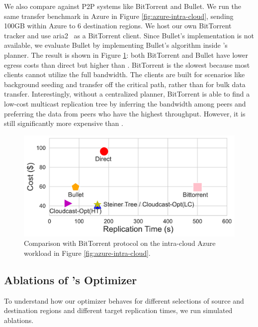We also compare \sys{} against P2P systems like BitTorrent and Bullet. 
We run the same transfer benchmark in Azure in Figure \ref{fig:azure-intra-cloud}, sending 100GB within Azure to 6 destination regions. We host our own BitTorrent tracker and use aria2~\cite{aria2} as a BitTorrent client. Since Bullet's implementation is not available, we evaluate Bullet by implementing Bullet's algorithm inside \sys{}'s planner. The result is shown in Figure \ref{fig:p2p_comparison}: both BitTorrent and Bullet have lower egress costs than direct but higher than \sys{}. BitTorrent is the slowest because most clients cannot utilize the full bandwidth. The clients are built for scenarios like background seeding and transfer off the critical path, rather than for bulk data transfer. Interestingly, without a centralized planner, BitTorrent is able to find a low-cost multicast replication tree by inferring the bandwidth among peers and preferring the data from peers who have the highest throughput. However, it is still significantly more expensive than \sys{}. 

\begin{figure}[t]
    \centering
     \includegraphics[width=.85\linewidth]{figures/p2p-comparison-all.pdf}
    \caption{Comparison with BitTorrent protocol on the intra-cloud Azure workload in Figure \ref{fig:azure-intra-cloud}. 
    }
    \label{fig:p2p_comparison}
\end{figure}

\subsection{Ablations of \sys{}'s Optimizer}
\label{sec:simulated_section}
To understand how our optimizer behaves for different selections of source and destination regions and different target replication times, we run simulated ablations. 



